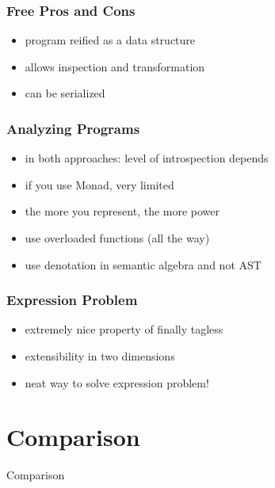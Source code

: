 \documentclass[aspectratio=169, hyperref={colorlinks, linkcolor=beamer@centricgreen}, urlcolor=links]{beamer}
\begin{document}
\begin{frame}
  \frametitle{Free \textemdash{} Pros and Cons}
  \begin{itemize}
  \item program reified as a data structure
  \item allows inspection and transformation
  \item can be serialized
  \end{itemize}
\end{frame}

\begin{frame}
  \frametitle{Analyzing Programs}
  \begin{itemize}
  \item in both approaches: level of introspection depends
  \item if you use Monad, very limited
  \item the more you represent, the more power
  \end{itemize}
\end{frame}

\begin{frame}
  \begin{itemize}
  \item use overloaded functions (all the way)
  \item use denotation in semantic algebra and not AST
  \end{itemize}
\end{frame}

\begin{frame}
  \frametitle{Expression Problem}
  \begin{itemize}
  \item extremely nice property of finally tagless
  \item extensibility in two dimensions
  \item neat way to solve expression problem!
  \end{itemize}
\end{frame}

\section{Comparison}\label{sec:comparison}

\begin{frame}
  \begin{center}
    \Huge
    Comparison
  \end{center}
\end{frame}
\end{document}
